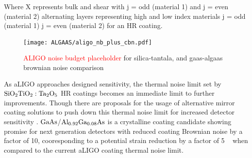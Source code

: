 \noindent Where X represents bulk and shear with j = odd (material 1) and j = even (material 2) alternating layers representing high and low index materials j = odd (material 1) j = even (material 2) for an HR coating.

\begin{figure}[H]
    \begin{center}
    \texttt{[image: ALGAAS/aligo\_nb\_plus\_cbn.pdf]}
    \end{center}
    \caption{\textcolor{red}{ALIGO noise budget placeholder} for silica-tantala, and gaas-algaas brownian noise comparison}
\label{fig:aligotncomp}
\end{figure}

%
%
%
%



As aLIGO approaches designed sensitivity, the thermal noise limit set by $\mathrm{SiO_2}\mathrm{TiO_2:Ta_2O_5}$ HR coatings becomes an immediate limit to further improvements. Though there are proposals for the usage of alternative mirror coating solutions to push down this thermal noise limit for increased detector sensitivity \cite{harry:aigwd2019}. $\mathrm{GaAs}$/$\mathrm{Al_{0.92}Ga_{0.08}As}$ is a crystalline coating candidate showing promise for next generation detectors with reduced coating Brownian noise by a factor of 10, cooresponding to a potential strain reduction by a factor of 5 ~\cite{cole:2013} when compared to the current aLIGO coating thermal noise limit. 

